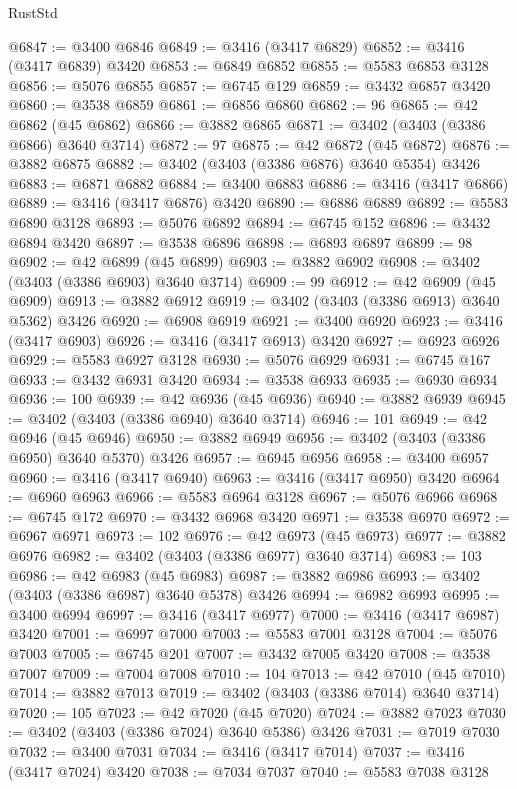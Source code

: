 \begin{lexlean}{RustStd}
\begin{coremodule}
@6847 := @3400 @6846
@6849 := @3416 (@3417 @6829)
@6852 := @3416 (@3417 @6839) @3420
@6853 := @6849 @6852
@6855 := @5583 @6853 @3128
@6856 := @5076 @6855
@6857 := @6745 @129
@6859 := @3432 @6857 @3420
@6860 := @3538 @6859
@6861 := @6856 @6860
@6862 := 96
@6865 := @42 @6862 (@45 @6862)
@6866 := @3882 @6865
@6871 := @3402 (@3403 (@3386 @6866) @3640 @3714)
@6872 := 97
@6875 := @42 @6872 (@45 @6872)
@6876 := @3882 @6875
@6882 := @3402 (@3403 (@3386 @6876) @3640 @5354) @3426
@6883 := @6871 @6882
@6884 := @3400 @6883
@6886 := @3416 (@3417 @6866)
@6889 := @3416 (@3417 @6876) @3420
@6890 := @6886 @6889
@6892 := @5583 @6890 @3128
@6893 := @5076 @6892
@6894 := @6745 @152
@6896 := @3432 @6894 @3420
@6897 := @3538 @6896
@6898 := @6893 @6897
@6899 := 98
@6902 := @42 @6899 (@45 @6899)
@6903 := @3882 @6902
@6908 := @3402 (@3403 (@3386 @6903) @3640 @3714)
@6909 := 99
@6912 := @42 @6909 (@45 @6909)
@6913 := @3882 @6912
@6919 := @3402 (@3403 (@3386 @6913) @3640 @5362) @3426
@6920 := @6908 @6919
@6921 := @3400 @6920
@6923 := @3416 (@3417 @6903)
@6926 := @3416 (@3417 @6913) @3420
@6927 := @6923 @6926
@6929 := @5583 @6927 @3128
@6930 := @5076 @6929
@6931 := @6745 @167
@6933 := @3432 @6931 @3420
@6934 := @3538 @6933
@6935 := @6930 @6934
@6936 := 100
@6939 := @42 @6936 (@45 @6936)
@6940 := @3882 @6939
@6945 := @3402 (@3403 (@3386 @6940) @3640 @3714)
@6946 := 101
@6949 := @42 @6946 (@45 @6946)
@6950 := @3882 @6949
@6956 := @3402 (@3403 (@3386 @6950) @3640 @5370) @3426
@6957 := @6945 @6956
@6958 := @3400 @6957
@6960 := @3416 (@3417 @6940)
@6963 := @3416 (@3417 @6950) @3420
@6964 := @6960 @6963
@6966 := @5583 @6964 @3128
@6967 := @5076 @6966
@6968 := @6745 @172
@6970 := @3432 @6968 @3420
@6971 := @3538 @6970
@6972 := @6967 @6971
@6973 := 102
@6976 := @42 @6973 (@45 @6973)
@6977 := @3882 @6976
@6982 := @3402 (@3403 (@3386 @6977) @3640 @3714)
@6983 := 103
@6986 := @42 @6983 (@45 @6983)
@6987 := @3882 @6986
@6993 := @3402 (@3403 (@3386 @6987) @3640 @5378) @3426
@6994 := @6982 @6993
@6995 := @3400 @6994
@6997 := @3416 (@3417 @6977)
@7000 := @3416 (@3417 @6987) @3420
@7001 := @6997 @7000
@7003 := @5583 @7001 @3128
@7004 := @5076 @7003
@7005 := @6745 @201
@7007 := @3432 @7005 @3420
@7008 := @3538 @7007
@7009 := @7004 @7008
@7010 := 104
@7013 := @42 @7010 (@45 @7010)
@7014 := @3882 @7013
@7019 := @3402 (@3403 (@3386 @7014) @3640 @3714)
@7020 := 105
@7023 := @42 @7020 (@45 @7020)
@7024 := @3882 @7023
@7030 := @3402 (@3403 (@3386 @7024) @3640 @5386) @3426
@7031 := @7019 @7030
@7032 := @3400 @7031
@7034 := @3416 (@3417 @7014)
@7037 := @3416 (@3417 @7024) @3420
@7038 := @7034 @7037
@7040 := @5583 @7038 @3128

\end{coremodule}
\end{lexlean}
